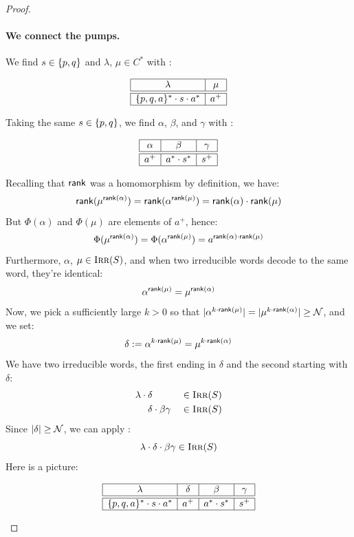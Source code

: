 \documentclass[../generics]{subfiles}
\begin{document}
\begin{proof}
\paragraph{We connect the pumps.}
We find $s \in \{p,q\}$ and $\lambda$, $\mu \in C^*$ with :
\begin{ceqn}
\[
\begin{array}{|c|c|}
\hline
\lambda & \mu \\
\hline
\hline
\{p,q,a\}^* \cdot s \cdot a^* & a^+ \\
\hline
\end{array}
\]
\end{ceqn}
Taking the same $s \in \{p,q\}$, we find $\alpha$, $\beta$, and $\gamma$ with :
\begin{ceqn}
\[
\begin{array}{|c|c|c|}
\hline
\alpha & \beta & \gamma \\
\hline
\hline
a^+ & a^* \cdot s^* & s^+ \\
\hline
\end{array}
\]
\end{ceqn}
Recalling that $\mathsf{rank}$ was a homomorphism by definition, we have:
\[\mathsf{rank}(\mu^{\mathsf{rank}(\alpha)}) = \mathsf{rank}(\alpha^{\mathsf{rank}(\mu)}) = \mathsf{rank}(\alpha) \cdot \mathsf{rank}(\mu)\]
But $\Phi(\alpha)$ and $\Phi(\mu)$ are elements of $a^+$, hence:
\[
\Phi(\mu^{\mathsf{rank}(\alpha)}) = \Phi(\alpha^{\mathsf{rank}(\mu)}) = a^{\mathsf{rank}(\alpha) \cdot \mathsf{rank}(\mu)}
\]
Furthermore, $\alpha$, $\mu \in \textsc{Irr}(S)$, and when two irreducible words decode to the same word, they're identical:
\[
\alpha^{\mathsf{rank}(\mu)} = \mu^{\mathsf{rank}(\alpha)}
\]
Now, we pick a sufficiently large $k > 0$ so that $|\alpha^{k \cdot \mathsf{rank}(\mu)}| = |\mu^{k \cdot \mathsf{rank}(\alpha)}| \geq \mathcal{N}$, and we set:
\[
\delta := \alpha^{k \cdot \mathsf{rank}(\mu)} = \mu^{k \cdot \mathsf{rank}(\alpha)}
\]
We have two irreducible words, the first ending in $\delta$ and the second starting with $\delta$:
\begin{alignat*}{2}
\lambda \cdot {} & \delta & {} \in \textsc{Irr}(S) \\
& \delta \cdot \beta \gamma & {} \in \textsc{Irr}(S)
\end{alignat*}
Since $|\delta| \geq \mathcal{N}$, we can apply :
\[
\lambda \cdot \delta \cdot \beta \gamma \in \textsc{Irr}(S)
\]
Here is a picture:
\begin{ceqn}
\[
\begin{array}{|c|c|c|c|}
\hline
\lambda & \delta & \beta & \gamma \\
\hline
\hline
\{p,q,a\}^* \cdot s \cdot a^* & a^+ & a^* \cdot s^* & s^+ \\
\hline
\end{array}
\]
\end{ceqn}


\end{proof}
\end{document}
